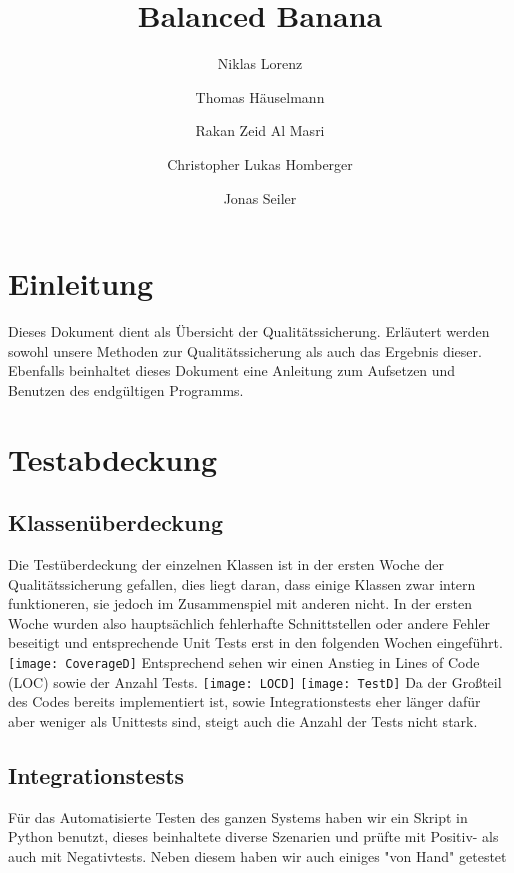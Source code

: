 \documentclass[a4paper,12pt]{article}
\title{Balanced Banana}
\author{Niklas Lorenz \and Thomas Häuselmann \and Rakan Zeid Al Masri \and Christopher Lukas Homberger \and Jonas Seiler}
\begin{document}
\setcounter{page}{2}
\tableofcontents          %
\clearpage
{}

\section{Einleitung}
\vspace{0.2cm}
Dieses Dokument dient als Übersicht der Qualitätssicherung. Erläutert werden sowohl unsere Methoden zur Qualitätssicherung als auch das Ergebnis dieser. Ebenfalls beinhaltet dieses Dokument eine Anleitung zum Aufsetzen und Benutzen des endgültigen Programms.
\section{Testabdeckung}
\subsection{Klassenüberdeckung}
\vspace{0.2cm}
Die Testüberdeckung der einzelnen Klassen ist in der ersten Woche der Qualitätssicherung gefallen, dies liegt daran, dass einige Klassen zwar intern funktioneren, sie jedoch im Zusammenspiel mit anderen nicht. In der ersten Woche wurden also hauptsächlich fehlerhafte Schnittstellen oder andere Fehler beseitigt und entsprechende Unit Tests erst in den folgenden Wochen eingeführt. \newline
\texttt{[image: CoverageD]} \newline
Entsprechend sehen wir einen Anstieg in Lines of Code (LOC) sowie der Anzahl Tests.
\texttt{[image: LOCD]} \newline
\texttt{[image: TestD]} \newline
Da der Großteil des Codes bereits implementiert ist, sowie Integrationstests eher länger dafür aber weniger als Unittests sind, steigt auch die Anzahl der Tests nicht stark.
\clearpage
\subsection{Integrationstests}
\vspace{0.2cm}
Für das Automatisierte Testen des ganzen Systems haben wir ein Skript in Python benutzt, dieses beinhaltete diverse Szenarien und prüfte mit Positiv- als auch mit Negativtests. Neben diesem haben wir auch einiges "von Hand" getestet 
\end{document}
